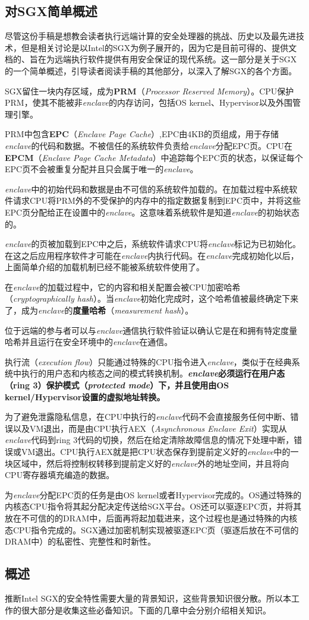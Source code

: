 \subsection{对SGX简单概述}
尽管这份手稿是想教会读者执行远端计算的安全处理器的挑战、历史以及最先进技术，但是相关讨论是以Intel的SGX为例子展开的，因为它是目前可得的、提供文档的、旨在为远端执行软件提供有用安全保证的现代系统。这一部分是关于SGX的一个简单概述，引导读者阅读手稿的其他部分，以深入了解SGX的各个方面。

SGX留住一块内存区域，成为\textbf{PRM}（\textit{Processor Reserved Memory}）。CPU保护PRM，使其不能被非\textit{enclave}的内存访问，包括OS kernel、Hypervisor以及外围管理引擎。

PRM中包含\textbf{EPC}（\textit{Enclave Page Cache}）,EPC由4KB的页组成，用于存储\textit{enclave}的代码和数据。不被信任的系统软件负责给\textit{enclave}分配EPC页。CPU在\textbf{EPCM}（\textit{Enclave Page Cache Metadata}）中追踪每个EPC页的状态，以保证每个EPC页不会被重复分配并且只会属于唯一的\textit{enclave}。

\textit{enclave}中的初始代码和数据是由不可信的系统软件加载的。在加载过程中系统软件请求CPU将PRM外的不受保护的内存中的指定数据复制到EPC页中，并将这些EPC页分配给正在设置中的\textit{enclave}。这意味着系统软件是知道\textit{enclave}的初始状态的。

\textit{enclave}的页被加载到EPC中之后，系统软件请求CPU将\textit{enclave}标记为已初始化。在这之后应用程序软件才可能在\textit{enclave}内执行代码。在\textit{enclave}完成初始化以后，上面简单介绍的加载机制已经不能被系统软件使用了。

在\textit{enclave}的加载过程中，它的内容和相关配置会被CPU加密哈希（\textit{cryptographically hash}）。当\textit{enclave}初始化完成时，这个哈希值被最终确定下来了，成为\textit{enclave}的\textbf{度量哈希}（\textit{measurement hash}）。

位于远端的参与者可以与\textit{enclave}通信执行软件验证以确认它是在和拥有特定度量哈希并且运行在安全环境中的\textit{enclave}在通信。

执行流（\textit{execution flow}）只能通过特殊的CPU指令进入\textit{enclave}，类似于在经典系统中执行的用户态和内核态之间的模式转换机制。\textbf{\textit{enclave}必须运行在用户态（ring 3）保护模式（\textit{protected mode}）下，并且使用由OS kernel/Hypervisor设置的虚拟地址转换。}

为了避免泄露隐私信息，在CPU中执行的\textit{enclave}代码不会直接服务任何中断、错误以及VM退出，而是由CPU执行AEX（\textit{Asynchronous Enclave Exit}）实现从\textit{enclave}代码到ring 3代码的切换，然后在给定清除故障信息的情况下处理中断，错误或VM退出。CPU执行AEX就是把CPU状态保存到提前定义好的\textit{enclave}中的一块区域中，然后将控制权转移到提前定义好的\textit{enclave}外的地址空间，并且将向CPU寄存器填充编造的数据。

为\textit{enclave}分配EPC页的任务是由OS kernel或者Hypervisor完成的。OS通过特殊的内核态CPU指令将其起分配决定传送给SGX平台。OS还可以驱逐EPC页，并将其放在不可信的的DRAM中，后面再将起加载进来，这个过程也是通过特殊的内核态CPU指令完成的。SGX通过加密机制实现被驱逐EPC页（驱逐后放在不可信的DRAM中）的私密性、完整性和时新性。

\subsection{概述}

推断Intel SGX的安全特性需要大量的背景知识，这些背景知识很分散。所以本工作的很大部分是收集这些必备知识。下面的几章中会分别介绍相关知识。
